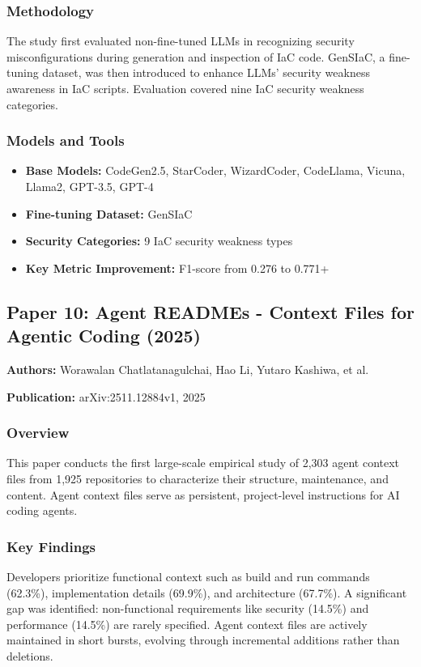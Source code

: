 \documentclass[11pt,a4paper]{article}
\begin{document}
\subsubsection{Methodology}
The study first evaluated non-fine-tuned LLMs in recognizing security misconfigurations during generation and inspection of IaC code. GenSIaC, a fine-tuning dataset, was then introduced to enhance LLMs' security weakness awareness in IaC scripts. Evaluation covered nine IaC security weakness categories.

\subsubsection{Models and Tools}
\begin{itemize}
    \item \textbf{Base Models:} CodeGen2.5, StarCoder, WizardCoder, CodeLlama, Vicuna, Llama2, GPT-3.5, GPT-4
    \item \textbf{Fine-tuning Dataset:} GenSIaC
    \item \textbf{Security Categories:} 9 IaC security weakness types
    \item \textbf{Key Metric Improvement:} F1-score from 0.276 to 0.771+
\end{itemize}

\subsection{Paper 10: Agent READMEs - Context Files for Agentic Coding (2025)}

\textbf{Authors:} Worawalan Chatlatanagulchai, Hao Li, Yutaro Kashiwa, et al.

\textbf{Publication:} arXiv:2511.12884v1, 2025

\subsubsection{Overview}
This paper conducts the first large-scale empirical study of 2,303 agent context files from 1,925 repositories to characterize their structure, maintenance, and content. Agent context files serve as persistent, project-level instructions for AI coding agents.

\subsubsection{Key Findings}
Developers prioritize functional context such as build and run commands (62.3\%), implementation details (69.9\%), and architecture (67.7\%). A significant gap was identified: non-functional requirements like security (14.5\%) and performance (14.5\%) are rarely specified. Agent context files are actively maintained in short bursts, evolving through incremental additions rather than deletions.
\end{document}
